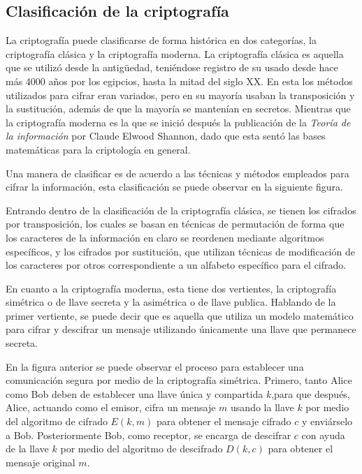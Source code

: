   \subsection{Clasificación de la criptografía}
  
    La criptografía puede clasificarse de forma histórica en dos categorías, 
    la criptografía clásica y la criptografía moderna. La criptografía clásica 
    es aquella que se utilizó desde la antigüedad, teniéndose registro de su 
    usado desde hace más 4000 años por los egipcios, hasta la mitad del siglo 
    XX. En esta los métodos utilizados para cifrar eran variados, pero en su 
    mayoría usaban la transposición y la sustitución, además de que la mayoría 
    se mantenían en secretos. Mientras que la criptografía moderna es la que 
    se inició después la publicación de la \textit{Teoría de la información} 
    por Claude Elwood Shannon, dado que esta sentó las bases matemáticas para 
    la criptología en general.
 
    Una manera de clasificar es de acuerdo a las técnicas y métodos empleados 
    para cifrar la información, esta clasificación se puede observar en la 
    siguiente figura.
  
    Entrando dentro de la clasificación de la criptografía clásica, se tienen 
    los cifrados por transposición, los cuales se basan en técnicas de 
    permutación de forma que los caracteres de la información en claro se 
    reordenen mediante algoritmos específicos, y los cifrados por sustitución, 
    que utilizan técnicas de modificación de los caracteres por otros 
    correspondiente a un alfabeto específico para el cifrado. 
  
    En cuanto a la criptografía moderna, esta tiene dos vertientes, la 
    criptografía simétrica o de llave secreta y la asimétrica o de llave 
    publica. Hablando de la primer vertiente, se puede decir que es aquella 
    que utiliza un modelo matemático para cifrar y descifrar un mensaje 
    utilizando únicamente una llave que permanece secreta.
  
    En la figura anterior se puede observar el proceso para establecer una 
    comunicación segura por medio de la criptografía simétrica. Primero, tanto 
    Alice como Bob deben de establecer una llave única y compartida $k$,para 
    que después, Alice, actuando como el emisor, cifra un mensaje $m$ usando 
    la llave $k$ por medio del algoritmo de cifrado $E(k,m)$ para obtener el 
    mensaje cifrado $c$ y enviárselo a Bob. Posteriormente Bob, como receptor, 
    se encarga de descifrar $c$ con ayuda de la llave $k$ por medio del 
    algoritmo de descifrado $D(k,c)$ para obtener el mensaje original $m$.
  
